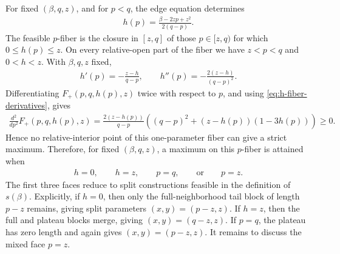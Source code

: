 \documentclass[10pt,a4paper]{article}
\begin{document}
    For fixed $(\beta,q,z)$, and for $p<q$, the edge equation determines
    \begin{align*}
      h(p)=\frac{\beta-2zp+z^2}{2(q-p)}.
    \end{align*}
    The feasible $p$-fiber is the closure in $[z,q]$ of those $p\in[z,q)$ for which $0\le h(p)\le z$.  On every relative-open part of the fiber we have $z<p<q$ and $0<h<z$.  With $\beta,q,z$ fixed,
    \begin{align}\label{eq:h-fiber-derivatives}
      h'(p)=-\frac{z-h}{q-p},
      \qquad
      h''(p)=-\frac{2(z-h)}{(q-p)^2}.
    \end{align}
    Differentiating $F_+(p,q,h(p),z)$ twice with respect to $p$, and using \eqref{eq:h-fiber-derivatives}, gives
    \begin{align}\label{eq:Fplus-second}
      \frac{d^2}{dp^2}F_+(p,q,h(p),z)=\frac{2(z-h(p))}{q-p}\left((q-p)^2+(z-h(p))(1-3h(p))\right)\ge0.
    \end{align}
    Hence no relative-interior point of this one-parameter fiber can give a strict maximum.  Therefore, for fixed $(\beta,q,z)$, a maximum on this $p$-fiber is attained when
    \begin{align*}
      h=0,
      \qquad h=z,
      \qquad p=q,
      \qquad\text{or}\qquad p=z.
    \end{align*}
    The first three faces reduce to split constructions feasible in the definition of $s(\beta)$.  Explicitly, if $h=0$, then only the full-neighborhood
    tail block of length $p-z$ remains, giving split parameters
    $(x,y)=(p-z,z)$.  If $h=z$, then the full and plateau blocks merge, giving
    $(x,y)=(q-z,z)$.  If $p=q$, the plateau has zero length and again gives
    $(x,y)=(p-z,z)$.  It remains to discuss the mixed face $p=z$.
    
\end{document}
